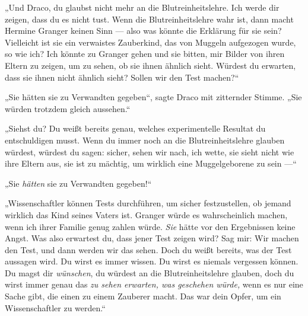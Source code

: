 „Und Draco, du glaubst nicht mehr an die Blutreinheitslehre. Ich werde dir zeigen, dass du es nicht tust. Wenn die Blutreinheitslehre wahr ist, dann macht Hermine Granger keinen Sinn — also was könnte die Erklärung für sie sein? Vielleicht ist sie ein verwaistes Zauberkind, das von Muggeln aufgezogen wurde, so wie ich? Ich könnte zu Granger gehen und sie bitten, mir Bilder von ihren Eltern zu zeigen, um zu sehen, ob sie ihnen ähnlich sieht. Würdest du erwarten, dass sie ihnen nicht ähnlich sieht? Sollen wir den Test machen?“

„Sie hätten sie zu Verwandten gegeben“, sagte Draco mit zitternder Stimme.
„Sie würden trotzdem gleich aussehen.“

„Siehst du? Du weißt bereits genau, welches experimentelle Resultat du entschuldigen musst. Wenn du immer noch an die Blutreinheitslehre glauben würdest, würdest du sagen: sicher, sehen wir nach, ich wette, sie sieht nicht wie ihre Eltern aus, sie ist zu mächtig, um wirklich eine Muggelgeborene zu sein —“

„Sie \emph{hätten} sie zu Verwandten gegeben!“

„Wissenschaftler können Tests durchführen, um sicher festzustellen, ob jemand wirklich das Kind seines Vaters ist. Granger würde es wahrscheinlich machen, wenn ich ihrer Familie genug zahlen würde. \emph{Sie} hätte vor den Ergebnissen keine Angst. Was also erwartest du, dass jener Test zeigen wird? Sag mir: Wir machen den Test, und dann werden wir das sehen. Doch du weißt bereits, was der Test aussagen wird. Du wirst es immer wissen. Du wirst es niemals vergessen können. Du magst dir \emph{wünschen}, du würdest an die Blutreinheitslehre glauben, doch du wirst immer genau das \emph{zu sehen erwarten, was geschehen würde,} wenn es nur eine Sache gibt, die einen zu einem Zauberer macht. Das war dein Opfer, um ein Wissenschaftler zu werden.“

